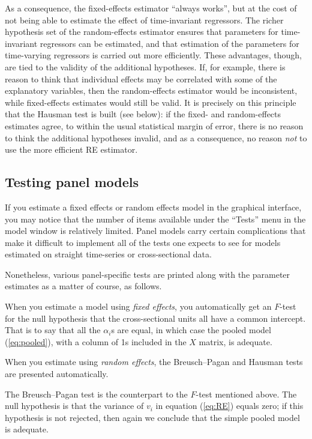 As a consequence, the fixed-effects estimator ``always works'', but at
the cost of not being able to estimate the effect of time-invariant
regressors.  The richer hypothesis set of the random-effects estimator
ensures that parameters for time-invariant regressors can be
estimated, and that estimation of the parameters for time-varying
regressors is carried out more efficiently.  These advantages, though,
are tied to the validity of the additional hypotheses. If, for
example, there is reason to think that individual effects may be
correlated with some of the explanatory variables, then the
random-effects estimator would be inconsistent, while fixed-effects
estimates would still be valid.  It is precisely on this principle
that the Hausman test is built (see below): if the fixed- and
random-effects estimates agree, to within the usual statistical margin
of error, there is no reason to think the additional hypotheses
invalid, and as a consequence, no reason \textit{not} to use the more
efficient RE estimator.

\subsection{Testing panel models}
\label{panel-tests}

If you estimate a fixed effects or random effects model in the
graphical interface, you may notice that the number of items available
under the ``Tests'' menu in the model window is relatively limited.
Panel models carry certain complications that make it difficult to
implement all of the tests one expects to see for models estimated on
straight time-series or cross-sectional data.  

Nonetheless, various panel-specific tests are printed along with the
parameter estimates as a matter of course, as follows.

When you estimate a model using \textsl{fixed effects}, you
automatically get an $F$-test for the null hypothesis that the
cross-sectional units all have a common intercept.  That is to say
that all the $\alpha_i$s are equal, in which case the pooled model
(\ref{eq:pooled}), with a column of 1s included in the $X$ matrix, is
adequate.

When you estimate using \textsl{random effects}, the Breusch--Pagan
and Hausman tests are presented automatically.  

The Breusch--Pagan test is the counterpart to the $F$-test mentioned
above.  The null hypothesis is that the variance of $v_i$ in
equation (\ref{eq:RE}) equals zero; if this hypothesis is not rejected,
then again we conclude that the simple pooled model is adequate.

